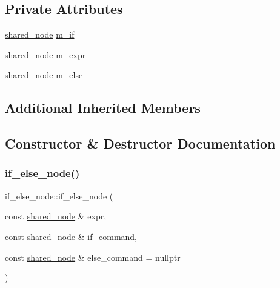\subsection*{Private Attributes}
\begin{DoxyCompactItemize}
\item 
\hyperlink{namespacejawe_a3f307481d921b6cbb50cc8511fc2b544}{shared\+\_\+node} \hyperlink{classjawe_1_1if__else__node_abc51dd41b42dcacd97c83c5bdd285ca2}{m\+\_\+if}
\item 
\hyperlink{namespacejawe_a3f307481d921b6cbb50cc8511fc2b544}{shared\+\_\+node} \hyperlink{classjawe_1_1if__else__node_ae089a0d09e1ea114212f494af2ca3a0d}{m\+\_\+expr}
\item 
\hyperlink{namespacejawe_a3f307481d921b6cbb50cc8511fc2b544}{shared\+\_\+node} \hyperlink{classjawe_1_1if__else__node_a7b8b1d90c0b27970fe96a73259236c73}{m\+\_\+else}
\end{DoxyCompactItemize}
\subsection*{Additional Inherited Members}


\subsection{Constructor \& Destructor Documentation}
\mbox{\label{classjawe_1_1if__else__node_a3ca222c371220791781da434b4454413}} 
\subsubsection{\texorpdfstring{if\+\_\+else\+\_\+node()}{if\_else\_node()}}
{\footnotesize\ttfamily if\+\_\+else\+\_\+node\+::if\+\_\+else\+\_\+node (\begin{DoxyParamCaption}\item[{const \hyperlink{namespacejawe_a3f307481d921b6cbb50cc8511fc2b544}{shared\+\_\+node} \&}]{expr,  }\item[{const \hyperlink{namespacejawe_a3f307481d921b6cbb50cc8511fc2b544}{shared\+\_\+node} \&}]{if\+\_\+command,  }\item[{const \hyperlink{namespacejawe_a3f307481d921b6cbb50cc8511fc2b544}{shared\+\_\+node} \&}]{else\+\_\+command = {\ttfamily nullptr} }\end{DoxyParamCaption})}



